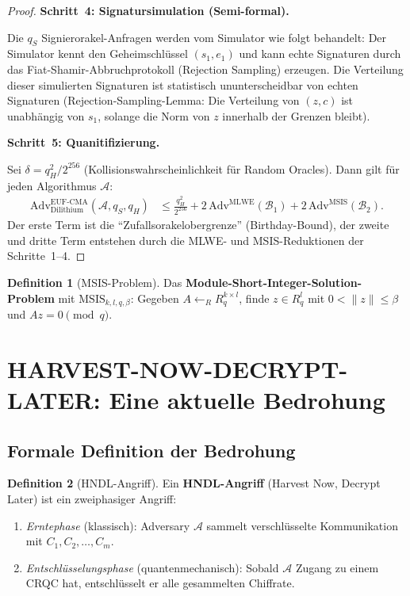 ﻿\documentclass[a4paper,12pt]{article}
\theoremstyle{definition}
\newtheorem{definition}{Definition}[section]
\begin{document}
\begin{proof}
\textbf{Schritt~4: Signatursimulation (Semi-formal).}

Die $q_S$ Signierorakel-Anfragen werden vom Simulator wie folgt behandelt:
Der Simulator kennt den Geheimschlüssel $(s_1, e_1)$ und kann echte Signaturen
durch das Fiat-Shamir-Abbruchprotokoll (Rejection Sampling) erzeugen.
Die Verteilung dieser simulierten Signaturen ist statistisch ununterscheidbar
von echten Signaturen (Rejection-Sampling-Lemma: Die Verteilung von $(z, c)$ 
ist unabhängig von $s_1$, solange die Norm von $z$ innerhalb der Grenzen bleibt).

\textbf{Schritt~5: Quanitifizierung.}

Sei $\delta = q_H^2 / 2^{256}$ (Kollisionswahrscheinlichkeit für Random Oracles).
Dann gilt für jeden Algorithmus $\mathcal{A}$:
\begin{align*}
\mathrm{Adv}^{\mathrm{EUF\text{-}CMA}}_{\mathrm{Dilithium}}(\mathcal{A}, q_S, q_H)
&\leq \frac{q_H^2}{2^{256}}
  + 2\,\mathrm{Adv}^{\mathrm{MLWE}}(\mathcal{B}_1)
  + 2\,\mathrm{Adv}^{\mathrm{MSIS}}(\mathcal{B}_2).
\end{align*}
Der erste Term ist die ``Zufallsorakelobergrenze'' (Birthday-Bound),
der zweite und dritte Term entstehen durch die MLWE- und MSIS-Reduktionen
der Schritte~1--4.
\end{proof}

\begin{definition}[MSIS-Problem]
Das \textbf{Module-Short-Integer-Solution-Problem} mit $\mathrm{MSIS}_{k,l,q,\beta}$:
Gegeben $A \leftarrow_R R_q^{k \times l}$, finde $z \in R_q^l$ mit $0 < \|z\| \leq \beta$
und $Az = 0 \pmod{q}$.
\end{definition}

\section{HARVEST-NOW-DECRYPT-LATER: Eine aktuelle Bedrohung}

\subsection{Formale Definition der Bedrohung}

\begin{definition}[HNDL-Angriff]
Ein \textbf{HNDL-Angriff} (Harvest Now, Decrypt Later) ist ein zweiphasiger Angriff:
\begin{enumerate}
\item \emph{Erntephase} (klassisch): Adversary $\mathcal{A}$ sammelt
  verschlüsselte Kommunikation mit $C_1, C_2, \ldots, C_m$.
\item \emph{Entschlüsselungsphase} (quantenmechanisch): Sobald $\mathcal{A}$
  Zugang zu einem CRQC hat, entschlüsselt er alle gesammelten Chiffrate.
\end{enumerate}
\end{definition}
\end{document}
